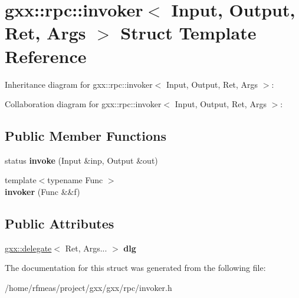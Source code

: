 \hypertarget{structgxx_1_1rpc_1_1invoker}{}\section{gxx\+:\+:rpc\+:\+:invoker$<$ Input, Output, Ret, Args $>$ Struct Template Reference}
\label{structgxx_1_1rpc_1_1invoker}


Inheritance diagram for gxx\+:\+:rpc\+:\+:invoker$<$ Input, Output, Ret, Args $>$\+:


Collaboration diagram for gxx\+:\+:rpc\+:\+:invoker$<$ Input, Output, Ret, Args $>$\+:
\subsection*{Public Member Functions}
\begin{DoxyCompactItemize}
\item 
status {\bfseries invoke} (Input \&inp, Output \&out)\hypertarget{structgxx_1_1rpc_1_1invoker_a50e5a0a28d7c04b91156f16a70bb972f}{}\label{structgxx_1_1rpc_1_1invoker_a50e5a0a28d7c04b91156f16a70bb972f}

\item 
{\footnotesize template$<$typename Func $>$ }\\{\bfseries invoker} (Func \&\&f)\hypertarget{structgxx_1_1rpc_1_1invoker_a14f7401bb1b445d38f743a2f8822508f}{}\label{structgxx_1_1rpc_1_1invoker_a14f7401bb1b445d38f743a2f8822508f}

\end{DoxyCompactItemize}
\subsection*{Public Attributes}
\begin{DoxyCompactItemize}
\item 
\hyperlink{classgxx_1_1delegate}{gxx\+::delegate}$<$ Ret, Args... $>$ {\bfseries dlg}\hypertarget{structgxx_1_1rpc_1_1invoker_a294a04a5da386c715cf8beedd049c3b7}{}\label{structgxx_1_1rpc_1_1invoker_a294a04a5da386c715cf8beedd049c3b7}

\end{DoxyCompactItemize}


The documentation for this struct was generated from the following file\+:\begin{DoxyCompactItemize}
\item 
/home/rfmeas/project/gxx/gxx/rpc/invoker.\+h\end{DoxyCompactItemize}
